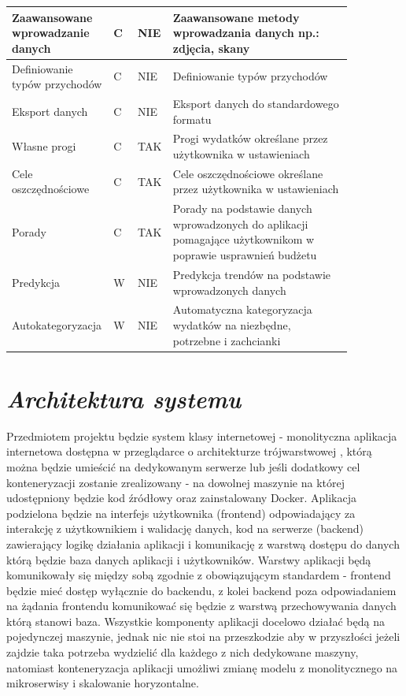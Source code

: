 \documentclass[a4paper,10pt, twoside]{report}
\newcommand{\customstylesection}[1]{\textbf{\textit{#1}}}
\begin{document}
\begin{large}
\begin{table}[H]
\begin{tabular}{|p{0.2\linewidth}|p{0.07\linewidth}|p{0.07\linewidth}|p{0.52\linewidth}|}
    \hline
    {Zaawansowane wprowadzanie danych} & {C} & {NIE} & {Zaawansowane metody wprowadzania danych np.: zdjęcia, skany}\\
    \hline
    {Definiowanie typów przychodów} & {C} & {NIE} & {Definiowanie typów przychodów}\\
    \hline
    {Eksport danych} & {C} & {NIE} & {Eksport danych do standardowego formatu}\\
    \hline
    {Własne progi} & {C} & {TAK} & {Progi wydatków określane przez użytkownika w ustawieniach}\\
    \hline
    {Cele oszczędnościowe} & {C} & {TAK} & {Cele oszczędnościowe określane przez użytkownika w ustawieniach}\\
    \hline
    {Porady} & {C} & {TAK} & {Porady na podstawie danych wprowadzonych do aplikacji 
    pomagające użytkownikom w poprawie usprawnień budżetu}\\
    \hline
    {Predykcja} & {W} & {NIE} & {Predykcja trendów na podstawie wprowadzonych danych}\\
    \hline
    {Autokategoryzacja} & {W} & {NIE} & {Automatyczna kategoryzacja wydatków na niezbędne, potrzebne i zachcianki}\\
    \hline
    \end{tabular}
\end{table}

\section{\customstylesection{Architektura systemu}}
{Przedmiotem projektu będzie system klasy internetowej - monolityczna aplikacja 
internetowa dostępna w przeglądarce o architekturze trójwarstwowej 
\cite{wzorceprojektowe}, którą można będzie umieścić na dedykowanym serwerze lub
 jeśli dodatkowy cel konteneryzacji zostanie zrealizowany - na dowolnej maszynie
 na której udostępniony będzie kod źródłowy oraz zainstalowany Docker. Aplikacja
 podzielona będzie na interfejs użytkownika (frontend) odpowiadający za 
interakcję z użytkownikiem i walidację danych, kod na serwerze (backend) 
zawierający logikę działania aplikacji i komunikację z warstwą dostępu do danych
 którą będzie baza danych aplikacji i użytkowników. Warstwy aplikacji będą 
komunikowały się między sobą zgodnie z obowiązującym standardem - frontend 
będzie mieć dostęp wyłącznie do backendu, z kolei backend poza odpowiadaniem na 
żądania frontendu komunikować się będzie z warstwą przechowywania danych którą 
stanowi baza. Wszystkie komponenty aplikacji docelowo działać będą na 
pojedynczej maszynie, jednak nic nie stoi na przeszkodzie aby w przyszłości 
jeżeli zajdzie taka potrzeba wydzielić dla każdego z nich dedykowane maszyny, 
natomiast konteneryzacja aplikacji umożliwi zmianę modelu z monolitycznego na 
mikroserwisy i skalowanie horyzontalne.}


\end{large}
\end{document}
